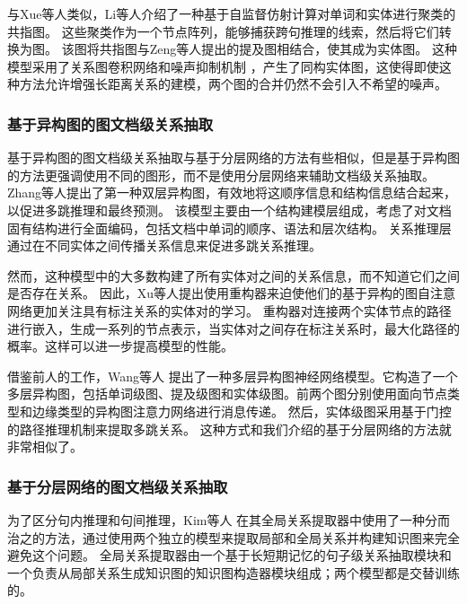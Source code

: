 \documentclass[bachelor]{thesis-uestc}
\begin{document}
与Xue等人类似，Li等人介绍了一种基于自监督仿射计算对单词和实体进行聚类的共指图。
这些聚类作为一个节点阵列，能够捕获跨句推理的线索，然后将它们转换为图。
该图将共指图与Zeng等人提出的提及图相结合，使其成为实体图。
这种模型采用了关系图卷积网络和噪声抑制机制 \cite{y2020-coreferential}，产生了同构实体图，这使得即使这种方法允许增强长距离关系的建模，两个图的合并仍然不会引入不希望的噪声。\par

\subsubsection{基于异构图的图文档级关系抽取}\label{subsec:heterogeneous-graph}
基于异构图的图文档级关系抽取与基于分层网络的方法有些相似，但是基于异构图的方法更强调使用不同的图形，而不是使用分层网络来辅助文档级关系抽取。
Zhang等人提出了第一种双层异构图，有效地将这顺序信息和结构信息结合起来，以促进多跳推理和最终预测。
该模型主要由一个结构建模层组成，考虑了对文档固有结构进行全面编码，包括文档中单词的顺序、语法和层次结构。
关系推理层通过在不同实体之间传播关系信息来促进多跳关系推理。\par

然而，这种模型中的大多数构建了所有实体对之间的关系信息，而不知道它们之间是否存在关系。
因此，Xu等人提出使用重构器来迫使他们的基于异构的图自注意网络更加关注具有标注关系的实体对的学习。
重构器对连接两个实体节点的路径进行嵌入，生成一系列的节点表示，当实体对之间存在标注关系时，最大化路径的概率。这样可以进一步提高模型的性能。 \par

借鉴前人的工作，Wang等人 提出了一种多层异构图神经网络模型。它构造了一个多层异构图，包括单词级图、提及级图和实体级图。前两个图分别使用面向节点类型和边缘类型的异构图注意力网络进行消息传递。
然后，实体级图采用基于门控的路径推理机制来提取多跳关系。
这种方式和我们介绍的基于分层网络的方法就非常相似了。\par

\subsubsection{基于分层网络的图文档级关系抽取}\label{subsec:layered-graph}

为了区分句内推理和句间推理，Kim等人 在其全局关系提取器中使用了一种分而治之的方法，通过使用两个独立的模型来提取局部和全局关系并构建知识图来完全避免这个问题。
全局关系提取器由一个基于长短期记忆的句子级关系抽取模块和一个负责从局部关系生成知识图的知识图构造器模块组成；两个模型都是交替训练的。\par
\end{document}
